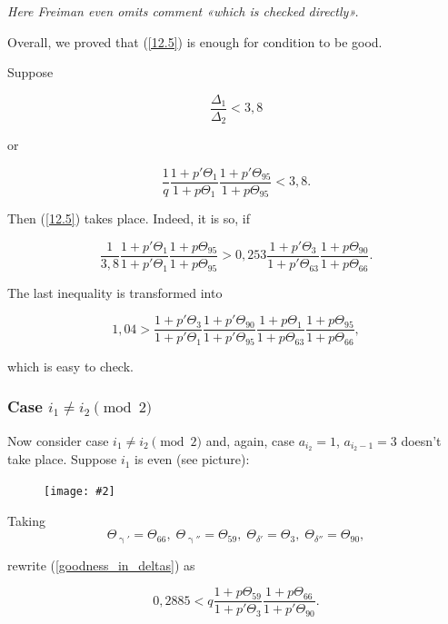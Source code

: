 \documentclass[a4paper, 12pt]{article}
\let\oldref\ref
\renewcommand{\ref}[1]{(\oldref{#1})}
\theoremstyle{definition}
\theoremstyle{definition}
\theoremstyle{proposition}
\theoremstyle{lemma}
\newcommand{\g}{\upgamma}
\renewcommand{\d}{\delta}
\newcommand{\D}{\Delta}
\newcommand{\T}{\Theta}
\newcommand{\pic}[2][1]{%
	\begin{figure}[H]
		\centering
		\texttt{[image: \#2]}
	\end{figure}
}
\begin{document}
{
	\itshape
	Here Freiman even omits comment «which is checked directly».
}

Overall, we proved that \ref{12.5} is enough for condition to be good.

Suppose

\begin{equation}\tag{12.8}\label{goodness_condition_3,8}
	\dfrac{\D_1}{\D_2} < 3,8
\end{equation}

or

\begin{equation*}
	\dfrac{1}{q}
	\dfrac{1 + p' \T_{1}}{1 + p \T_{1}}
	\dfrac{1 + p' \T_{95}}{1 + p \T_{95}}
	<
	3,8.
\end{equation*}

Then \ref{12.5} takes place. Indeed, it is so, if

\begin{equation*}
	\dfrac{1}{3,8}
	\dfrac{1 + p' \T_{1}}{1 + p' \T_{1}}
	\dfrac{1 + p \T_{95}}{1 + p \T_{95}}
	>
	0,253
	\dfrac{1 + p' \T_{3}}{1 + p' \T_{63}}
	\dfrac{1 + p \T_{90}}{1 + p \T_{66}}.
\end{equation*}

The last inequality is transformed into

\begin{equation*}
	1,04
	>
	\dfrac{1 + p' \T_{3}}{1 + p' \T_{1}}
	\dfrac{1 + p' \T_{90}}{1 + p' \T_{95}}
	\dfrac{1 + p \T_{1}}{1 + p \T_{63}}
	\dfrac{1 + p \T_{95}}{1 + p \T_{66}},
\end{equation*}

which is easy to check.

\subsubsection{Case $i_1 \ne i_2 \pmod 2$}

Now consider case $i_1 \ne i_2 \pmod 2$
and, again, case $a_{i_2} = 1$, $a_{i_2 - 1} = 3$
doesn't take place.
Suppose $i_1$ is even (see picture):

\pic[0.6]{pic5}

Taking
\begin{equation*}
	\T_{\g'} = \T_{66},\;
	\T_{\g''} = \T_{59},\;
	\T_{\d'} = \T_{3},\;
	\T_{\d''} = \T_{90},
\end{equation*}

rewrite \ref{goodness_in_deltas} as

\begin{equation}\tag{12.9}\label{12.9}
	0,2885
	<
	q
	\dfrac{1 + p \T_{59}}{1 + p' \T_{3}}
	\dfrac{1 + p \T_{66}}{1 + p' \T_{90}}.
\end{equation}
\end{document}
